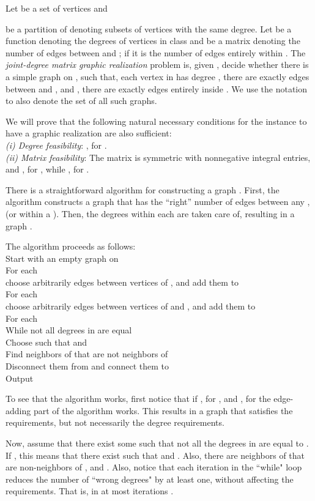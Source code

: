 \documentclass[12pt,a4paper]{article}
\theoremstyle{definition}
\theoremstyle{plain}
\begin{document}
Let  be a set of vertices and 

be a partition of  denoting
subsets of vertices with the same degree. Let 
be a function denoting the degrees
of vertices in class  and  be a  matrix
denoting the number of edges between  and ;
if  it is the number of edges entirely within .
The {\it joint-degree matrix graphic realization} problem is,
given , decide
whether there is a simple graph  on , such that,
 each vertex in  has degree ,
 there are exactly  edges between  and ,
and , there are exactly  edges entirely inside .
We use the notation 
to also denote the set of all such graphs.

We will prove that the following natural
necessary conditions for the instance 
to have a graphic realization are also sufficient:\smallskip\\
{\it (i) Degree feasibility}:
, for . \smallskip\\
{\it (ii) Matrix feasibility}:
The matrix  is symmetric with nonnegative integral entries,
and
, for ,
while
, for .\smallskip

There is a straightforward algorithm for constructing a graph 
. First, the algorithm
constructs a graph  that has the ``right'' number of edges
between any ,  (or within a ). Then, the degrees 
within each  are taken care of, resulting in a graph
.

The algorithm proceeds as follows:\medskip\\
Start with an empty graph  on \\
For each \\  choose arbitrarily  edges between
vertices of , and add them to \\
For each \\  choose arbitrarily  edges between
vertices of  and , and add them to \\
For each \\ 
 While not all degrees in  are equal\\
  Choose  such that 
and \\
  Find  
neighbors of  that are not neighbors of \\
  Disconnect them from  and connect them to \\
Output \medskip

To see that the algorithm works, first notice that if 
, for ,
and
, for 
the edge-adding part of the algorithm works. This results in a graph 
 that satisfies the  requirements, but not necessarily 
the degree requirements. 

Now, assume that there exist some  such that
not all the degrees in  are equal to . If 
, this means that there exist 
 such that 
and . Also, there are 
neighbors of  that are non-neighbors of , and 
.
Also, notice that each iteration in the ``while" loop reduces 
the number of ``wrong degrees" by at least one, without affecting 
the  requirements. That is, in at most  iterations
.\medskip
\end{document}

